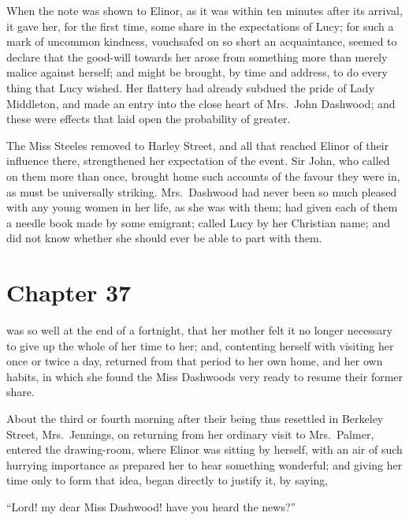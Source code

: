 When the note was shown to Elinor, as it was within ten
minutes after its arrival, it gave her, for the first time,
some share in the expectations of Lucy; for such a mark
of uncommon kindness, vouchsafed on so short an acquaintance,
seemed to declare that the good-will towards her arose
from something more than merely malice against herself;
and might be brought, by time and address, to do
every thing that Lucy wished.  Her flattery had already
subdued the pride of Lady Middleton, and made an entry
into the close heart of Mrs.\ John Dashwood; and these
were effects that laid open the probability of greater.

The Miss Steeles removed to Harley Street, and all
that reached Elinor of their influence there, strengthened
her expectation of the event.  Sir John, who called on
them more than once, brought home such accounts of the
favour they were in, as must be universally striking.
Mrs.\ Dashwood had never been so much pleased with any
young women in her life, as she was with them; had given
each of them a needle book made by some emigrant;
called Lucy by her Christian name; and did not know
whether she should ever be able to part with them.









\chapter{Chapter 37}


 was so well at the end of a fortnight,
that her mother felt it no longer necessary to give up
the whole of her time to her; and, contenting herself with
visiting her once or twice a day, returned from that period
to her own home, and her own habits, in which she found
the Miss Dashwoods very ready to resume their former share.

About the third or fourth morning after their
being thus resettled in Berkeley Street, Mrs.\ Jennings,
on returning from her ordinary visit to Mrs.\ Palmer,
entered the drawing-room, where Elinor was sitting
by herself, with an air of such hurrying importance
as prepared her to hear something wonderful; and giving her
time only to form that idea, began directly to justify it,
by saying,

``Lord! my dear Miss Dashwood! have you heard the news?''


